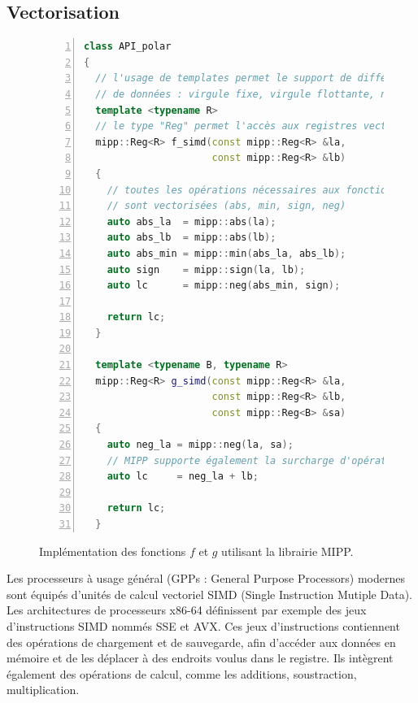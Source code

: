 \subsection{Vectorisation}

\begin{figure}
\begin{lstlisting}[language=C++, numbers=left, numbersep=0.3em, tabsize=2, basicstyle=\footnotesize\ttfamily]
class API_polar
{
  // l'usage de templates permet le support de différents formats
  // de données : virgule fixe, virgule flottante, nombre de bits
  template <typename R>
  // le type "Reg" permet l'accès aux registres vectoriels
  mipp::Reg<R> f_simd(const mipp::Reg<R> &la,
                      const mipp::Reg<R> &lb)
  {
    // toutes les opérations nécessaires aux fonctions polaires
    // sont vectorisées (abs, min, sign, neg)
    auto abs_la  = mipp::abs(la);
    auto abs_lb  = mipp::abs(lb);
    auto abs_min = mipp::min(abs_la, abs_lb);
    auto sign    = mipp::sign(la, lb);
    auto lc      = mipp::neg(abs_min, sign);

    return lc;
  }

  template <typename B, typename R>
  mipp::Reg<R> g_simd(const mipp::Reg<R> &la,
                      const mipp::Reg<R> &lb,
                      const mipp::Reg<B> &sa)
  {
    auto neg_la = mipp::neg(la, sa);
    // MIPP supporte également la surcharge d'opérateurs
    auto lc     = neg_la + lb;

    return lc;
  }

  \end{lstlisting}
  \caption{Implémentation des fonctions $f$ et $g$ utilisant la librairie MIPP.}
  \label{fig:mipp}
  \end{figure}

Les processeurs à usage général (GPPs : General Purpose Processors) modernes sont équipés d'unités de calcul vectoriel SIMD (Single Instruction Mutiple Data). Les architectures de processeurs x86-64 définissent par exemple des jeux d'instructions SIMD nommés SSE et AVX. Ces jeux d'instructions contiennent des opérations de chargement et de sauvegarde, afin d'accéder aux données en mémoire et de les déplacer à des endroits voulus dans le registre. Ils intègrent également des opérations de calcul, comme les additions, soustraction, multiplication.

